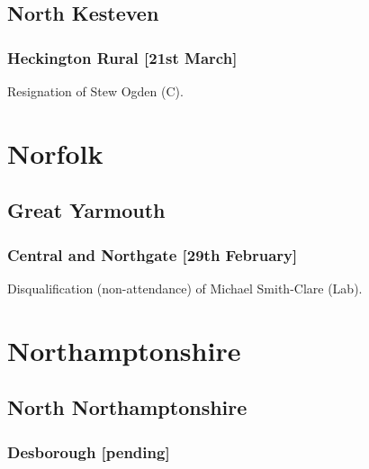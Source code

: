 \documentclass[a4paper,openany]{book}
\begin{document}
\begin{resultsiii}
\subsection*{North Kesteven}

\subsubsection*{Heckington Rural \hspace*{\fill}\nolinebreak[1]%
	\enspace\hspace*{\fill}
	[21st March]}


Resignation of Stew Ogden (C).

\section{Norfolk}

\subsection*{Great Yarmouth}

\subsubsection*{Central and Northgate \hspace*{\fill}\nolinebreak[1]%
	\enspace\hspace*{\fill}
	[29th February]}


Disqualification (non-attendance) of Michael Smith-Clare (Lab).

\section{Northamptonshire}

\subsection*{North Northamptonshire}

\subsubsection*{Desborough \hspace*{\fill}\nolinebreak[1]%
	\enspace\hspace*{\fill}
	[pending]}


\end{resultsiii}
\end{document}
